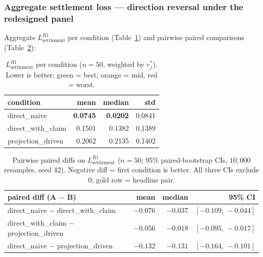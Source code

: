 \subsubsection{Aggregate settlement loss --- direction reversal under the redesigned panel}
\label{sec:results:exp2:aggregate}

Aggregate $L_{\text{settlement}}^{R1}$ per condition (Table~\ref{tab:exp2_aggregate}) and pairwise paired comparisons (Table~\ref{tab:exp2_paired}):

\begin{table}[t]
\centering
\caption{$L_{\text{settlement}}^{R1}$ per condition ($n = 50$, weighted by $r^*_j$). Lower is better; green = best, orange = mid, red = worst.}
\label{tab:exp2_aggregate}
\begin{tabular}{lrrr}
\toprule
\textbf{condition} & \textbf{mean} & \textbf{median} & \textbf{std} \\
\midrule
direct\_naive       & \cellcolor{HMGood}\textbf{0.0745} & \cellcolor{HMGood}\textbf{0.0202} & \cellcolor{HMBackground}0.0841 \\
direct\_with\_claim & \cellcolor{HMMid}0.1501          & \cellcolor{HMMid}0.1382          & \cellcolor{HMBackground}0.1389 \\
projection\_driven  & \cellcolor{HMHigh}0.2062          & \cellcolor{HMHigh}0.2135          & \cellcolor{HMBackground}0.1402 \\
\bottomrule
\end{tabular}
\end{table}

\begin{table}[!t]
\centering
\caption{Pairwise paired diffs on $L_{\text{settlement}}^{R1}$ ($n = 50$; 95\% paired-bootstrap CIs, $10{,}000$ resamples, seed 42). Negative diff = first condition is better. All three CIs exclude $0$; gold row = headline pair.}
\label{tab:exp2_paired}
\begin{tabular}{lrrr}
\toprule
\textbf{paired diff (A $-$ B)} & \textbf{mean} & \textbf{median} & \textbf{95\% CI} \\
\midrule
direct\_naive $-$ direct\_with\_claim     & $-0.076$ & $-0.037$ & $[-0.109,\, -0.044]$ \\
direct\_with\_claim $-$ projection\_driven & $-0.056$ & $-0.018$ & $[-0.095,\, -0.017]$ \\
\rowcolor{HMHeadline}
direct\_naive $-$ projection\_driven      & $\mathbf{-0.132}$ & $\mathbf{-0.131}$ & $\mathbf{[-0.164,\, -0.101]}$ \\
\bottomrule
\end{tabular}
\end{table}

